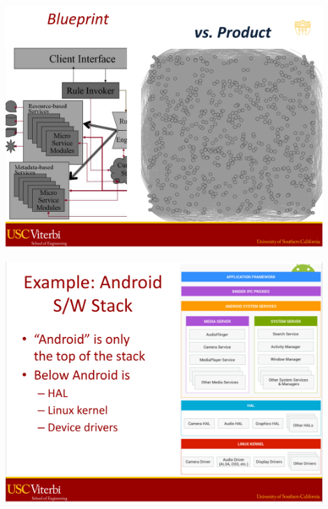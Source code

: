\documentclass[xetex,mathserif,serif]{beamer}
\begin{document}
	\begin{frame}
		\begin{center}
			\includegraphics[width=0.9\textwidth]{medvidovic1.png}
		\end{center}
	\end{frame}

	\begin{frame}
		\begin{center}
			\includegraphics[width=0.9\textwidth]{medvidovic2.png}
		\end{center}
	\end{frame}
\end{document}

